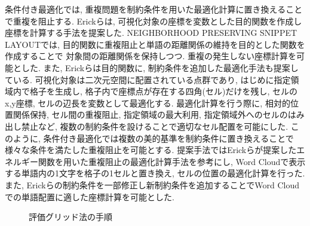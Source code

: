 \documentclass[syuuron]{kuee}
\begin{document}
		条件付き最適化では, 重複問題を制約条件を用いた最適化計算に置き換えることで重複を阻止する. 
		Erickらは, 可視化対象の座標を変数とした目的関数を作成し座標を計算する手法を提案した\cite{or1}. 
		NEIGHBORHOOD PRESERVING SNIPPET LAYOUTでは, 目的関数に重複阻止と単語の距離関係の維持を目的とした関数を作成することで
		対象間の距離関係を保持しつつ. 重複の発生しない座標計算を可能とした. 
		また, Erickらは目的関数に, 制約条件を追加した最適化手法も提案している\cite{or2}.  
		可視化対象は二次元空間に配置されている点群であり, はじめに指定領域内で格子を生成し, 格子内で座標点が存在する四角(セル)だけを残し, 
		セルのx,y座標, セルの辺長を変数として最適化する. 
		最適化計算を行う際に, 相対的位置関係保持, セル間の重複阻止, 指定領域の最大利用, 指定領域外へのセルのはみ出し禁止など, 
		複数の制約条件を設けることで適切なセル配置を可能にした. 
		このように, 条件付き最適化では複数の美的基準を制約条件に置き換えることで様々な条件を満たした重複阻止を可能とする. 
		提案手法ではErickらが提案したエネルギー関数を用いた重複阻止の最適化計算手法を参考にし, 
		Word Cloudで表示する単語内の1文字を格子の1セルと置き換え, セルの位置の最適化計算を行った. 
		また, Erickらの制約条件を一部修正し新制約条件を追加することでWord Cloudでの単語配置に適した座標計算を可能とした. 
		
		\begin{figure}
			\begin{center}
			\end{center}
			\caption{評価グリッド法の手順\cite{egm6}}
	  		\label{fig:egm1}
		\end{figure}
\end{document}
